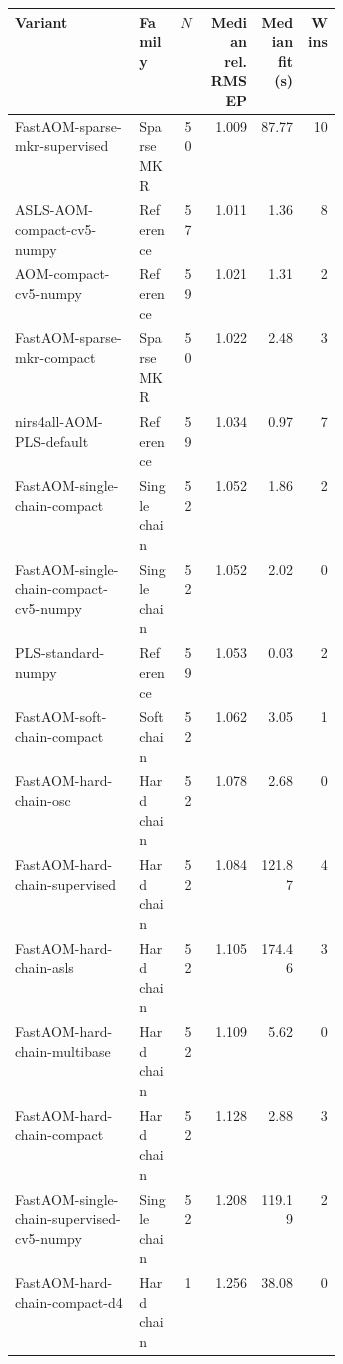 \begin{tabularx}{\linewidth}{p{0.38\linewidth}lrrrr}
\toprule
Variant & Family & $N$ & Median rel. RMSEP & Median fit (s) & Wins \\
\midrule
FastAOM-\allowbreak{}sparse-\allowbreak{}mkr-\allowbreak{}supervised & Sparse MKR & 50 & 1.009 & 87.77 & 10 \\
ASLS-\allowbreak{}AOM-\allowbreak{}compact-\allowbreak{}cv5-\allowbreak{}numpy & Reference & 57 & 1.011 & 1.36 & 8 \\
AOM-\allowbreak{}compact-\allowbreak{}cv5-\allowbreak{}numpy & Reference & 59 & 1.021 & 1.31 & 2 \\
FastAOM-\allowbreak{}sparse-\allowbreak{}mkr-\allowbreak{}compact & Sparse MKR & 50 & 1.022 & 2.48 & 3 \\
nirs4all-\allowbreak{}AOM-\allowbreak{}PLS-\allowbreak{}default & Reference & 59 & 1.034 & 0.97 & 7 \\
FastAOM-\allowbreak{}single-\allowbreak{}chain-\allowbreak{}compact & Single chain & 52 & 1.052 & 1.86 & 2 \\
FastAOM-\allowbreak{}single-\allowbreak{}chain-\allowbreak{}compact-\allowbreak{}cv5-\allowbreak{}numpy & Single chain & 52 & 1.052 & 2.02 & 0 \\
PLS-\allowbreak{}standard-\allowbreak{}numpy & Reference & 59 & 1.053 & 0.03 & 2 \\
FastAOM-\allowbreak{}soft-\allowbreak{}chain-\allowbreak{}compact & Soft chain & 52 & 1.062 & 3.05 & 1 \\
FastAOM-\allowbreak{}hard-\allowbreak{}chain-\allowbreak{}osc & Hard chain & 52 & 1.078 & 2.68 & 0 \\
FastAOM-\allowbreak{}hard-\allowbreak{}chain-\allowbreak{}supervised & Hard chain & 52 & 1.084 & 121.87 & 4 \\
FastAOM-\allowbreak{}hard-\allowbreak{}chain-\allowbreak{}asls & Hard chain & 52 & 1.105 & 174.46 & 3 \\
FastAOM-\allowbreak{}hard-\allowbreak{}chain-\allowbreak{}multibase & Hard chain & 52 & 1.109 & 5.62 & 0 \\
FastAOM-\allowbreak{}hard-\allowbreak{}chain-\allowbreak{}compact & Hard chain & 52 & 1.128 & 2.88 & 3 \\
FastAOM-\allowbreak{}single-\allowbreak{}chain-\allowbreak{}supervised-\allowbreak{}cv5-\allowbreak{}numpy & Single chain & 52 & 1.208 & 119.19 & 2 \\
FastAOM-\allowbreak{}hard-\allowbreak{}chain-\allowbreak{}compact-\allowbreak{}d4 & Hard chain & 1 & 1.256 & 38.08 & 0 \\
\bottomrule
\end{tabularx}
